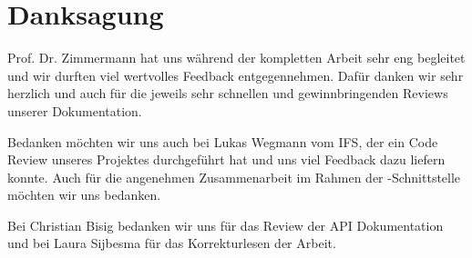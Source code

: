 \section*{Danksagung}

	Prof. Dr. Zimmermann hat uns während der kompletten Arbeit sehr eng begleitet und wir durften viel wertvolles Feedback entgegennehmen.
	Dafür danken wir sehr herzlich und auch für die jeweils sehr schnellen und gewinnbringenden Reviews unserer Dokumentation.
	
	Bedanken möchten wir uns auch bei Lukas Wegmann vom IFS,
	der ein Code Review unseres Projektes durchgeführt hat und uns viel Feedback dazu liefern konnte.
	Auch für die angenehmen Zusammenarbeit im Rahmen der \dks -Schnittstelle möchten wir uns bedanken.
	
	Bei Christian Bisig bedanken wir uns für das Review der API Dokumentation
	und bei Laura Sijbesma für das Korrekturlesen der Arbeit.
